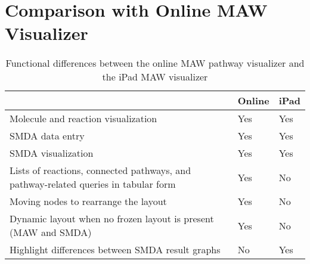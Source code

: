 \section{Comparison with Online MAW Visualizer}
\label{sect:maw_comparison}

\begin{table}[ht!]
\centering
\begin{tabular}{ | p{3in} | l | l | }
    \hline
                        & Online    & iPad \\ \hline

    Molecule and reaction visualization
                        & Yes       & Yes \\ \hline

    SMDA data entry     & Yes       & Yes \\ \hline

    SMDA visualization  & Yes       & Yes \\ \hline

    Lists of reactions, connected pathways, and pathway-related queries in
    tabular form
                        & Yes       & No \\ \hline

    Moving nodes to rearrange the layout
                        & Yes       & No \\ \hline

    Dynamic layout when no frozen layout is present (MAW and SMDA)
                        & Yes       & No \\ \hline

    Highlight differences between SMDA result graphs
                        & No        & Yes \\ \hline
\end{tabular}
    \label{fig:maw_comparison_table}
    \caption{Functional differences between the online MAW pathway visualizer
    and the iPad MAW visualizer}
\end{table}

